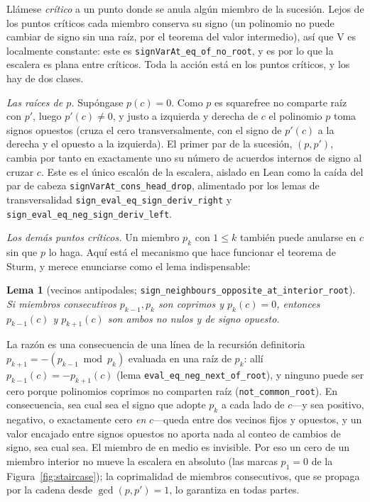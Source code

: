 \documentclass[11pt]{article}
\newtheorem{lemma}{Lema}
\newcommand{\lean}[1]{\texttt{#1}}
\newcommand{\V}{\mathrm{V}}
\begin{document}
Ll\'amese \emph{cr\'itico} a un punto donde se anula alg\'un miembro de la sucesi\'on. Lejos de los
puntos cr\'iticos cada miembro conserva su signo (un polinomio no puede cambiar de signo sin una
ra\'iz, por el teorema del valor intermedio), as\'i que $\V$ es localmente constante: este es
\lean{signVarAt\_eq\_of\_no\_root}, y es por lo que la escalera es plana entre cr\'iticos. Toda la
acci\'on est\'a en los puntos cr\'iticos, y los hay de dos clases.

\emph{Las ra\'ices de $p$.} Sup\'ongase $p(c)=0$. Como $p$ es squarefree no comparte ra\'iz con $p'$,
luego $p'(c)\ne0$, y justo a izquierda y derecha de $c$ el polinomio $p$ toma signos opuestos (cruza
el cero transversalmente, con el signo de $p'(c)$ a la derecha y el opuesto a la izquierda). El primer
par de la sucesi\'on, $(p,p')$, cambia por tanto en exactamente uno su n\'umero de acuerdos internos
de signo al cruzar $c$. Este es el \'unico escal\'on de la escalera, aislado en Lean como la ca\'ida
del par de cabeza \lean{signVarAt\_cons\_head\_drop}, alimentado por los lemas de transversalidad
\lean{sign\_eval\_eq\_sign\_deriv\_right} y \lean{sign\_eval\_eq\_neg\_sign\_deriv\_left}.

\emph{Los dem\'as puntos cr\'iticos.} Un miembro $p_k$ con $1\le k$ tambi\'en puede anularse en $c$
sin que $p$ lo haga. Aqu\'i est\'a el mecanismo que hace funcionar el teorema de Sturm, y merece
enunciarse como el lema indispensable:
\begin{lemma}[vecinos antipodales; \lean{sign\_neighbours\_opposite\_at\_interior\_root}]
\label{lem:antipodal}
Si miembros consecutivos $p_{k-1},p_k$ son coprimos y $p_k(c)=0$, entonces $p_{k-1}(c)$ y
$p_{k+1}(c)$ son ambos no nulos y de signo \emph{opuesto}.
\end{lemma}
La raz\'on es una consecuencia de una l\'inea de la recursi\'on definitoria $p_{k+1}=-(p_{k-1}\bmod
p_k)$ evaluada en una ra\'iz de $p_k$: all\'i $p_{k-1}(c)=-p_{k+1}(c)$ (lema
\lean{eval\_eq\_neg\_next\_of\_root}), y ninguno puede ser cero porque polinomios coprimos no comparten
ra\'iz (\lean{not\_common\_root}). En consecuencia, sea cual sea el signo que adopte $p_k$ a cada lado
de $c$---y sea positivo, negativo, o exactamente cero \emph{en} $c$---queda entre dos vecinos fijos y
opuestos, y un valor encajado entre signos opuestos no aporta nada al conteo de cambios de signo, sea
cual sea. El miembro de en medio es invisible. Por eso un cero de un miembro interior no mueve la
escalera en absoluto (las marcas $p_1=0$ de la Figura~\ref{fig:staircase}); la coprimalidad de
miembros consecutivos, que se propaga por la cadena desde $\gcd(p,p')=1$, lo garantiza en todas
partes.
\end{document}
